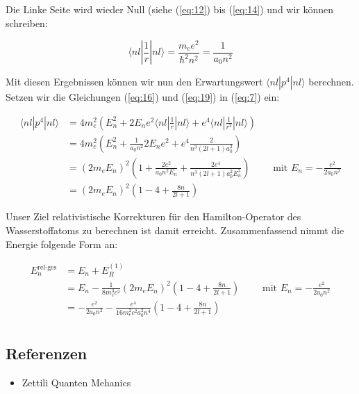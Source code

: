 Die Linke Seite wird wieder Null (siehe (\ref{eq:12}) bis (\ref{eq:14}) und wir können schreiben:

\begin{equation}
  \label{eq:19}
  \boxed{\langle nl|\frac{1}{r}|nl\rangle = \frac{m_e e^2}{ \hbar^2 n^2} = \frac{1}{a_0 n^2}}
\end{equation}

Mit diesen Ergebnissen können wir nun den Erwartungswert \(\langle nl | p^4 |nl \rangle \) berechnen. Setzen wir die Gleichungen (\ref{eq:16}) und (\ref{eq:19}) in (\ref{eq:7}) ein:

\begin{align}
  \label{eq:20}
   \langle nl|p^4|nl\rangle &= 4m_e^2 \left( E_n^2 + 2E_ne^2\langle nl| \frac{1}{r}|nl\rangle + e^4\langle nl|\frac{1}{r^2}|nl\rangle\right)  \\
&= 4m_e^2 \left( E_n^2 + \frac{1}{a_0 n^2}2E_ne^2 + e^4 \frac{2}{n^3(2l+1)a_0^2}  \right) \\
&= (2m_eE_n)^2 \left( 1 + \frac{2e^2}{a_0 n^2E_n} +  \frac{2e^4}{n^3(2l+1)a_0^2E_n^2}  \right) \qquad \text{ mit }E_n=-\frac{e^2}{2a_0n^2} \\
&= (2m_eE_n)^2 \left( 1 - 4 +  \frac{8n }{2l+1}  \right)
\end{align}


Unser Ziel relativistische Korrekturen für den Hamilton-Operator des Wasserstoffatoms zu berechnen ist damit erreicht. Zusammenfassend nimmt die Energie folgende Form an:

\begin{align}
  \label{eq:21}
  E_n^{\text{rel-ges}} &= E_n + E^{(1)}_R\\
&= E_n - \frac{1}{8m_e^3c^2}(2m_eE_n)^2 \left( 1 - 4 +  \frac{8n }{2l+1}  \right)\qquad \text{ mit }E_n=-\frac{e^2}{2a_0n^2}  \\
&= -\frac{e^2}{2a_0n^2} - \frac{e^4}{16m_e^2c^2a_0^2n^4 } \left( 1 - 4 +  \frac{8n }{2l+1}  \right) \\
\end{align}




\subsection*{Referenzen}
\begin{itemize}
\item Zettili Quanten Mehanics
\end{itemize}



